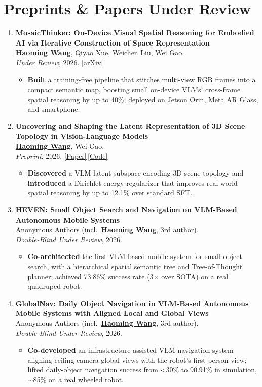 \documentclass[11pt, letterpaper]{article}
\newenvironment{publist}{
  \begin{enumerate}[leftmargin=1.7em, itemsep=4pt, parsep=0pt, topsep=2pt, label=\arabic*.]
}{\end{enumerate}}
\newcommand{\impactbullet}[1]{%
  \par\vspace{1pt}%
  \begin{itemize}[leftmargin=1.2em, topsep=0pt, itemsep=0pt, parsep=0pt, partopsep=0pt]
    \item #1
  \end{itemize}}
\newcommand{\me}{\underline{\textbf{Haoming Wang}}}
\newcommand{\meanon}{\underline{\textbf{Haoming Wang}}}
\begin{document}
\section{Preprints \& Papers Under Review}

\begin{publist}
\item \textbf{MosaicThinker: On-Device Visual Spatial Reasoning for Embodied AI via Iterative Construction of Space Representation}\\
\me, Qiyao Xue, Weichen Liu, Wei Gao.\\
\textit{Under Review}, 2026. \href{https://www.arxiv.org/abs/2602.07082}{[arXiv]}
\impactbullet{\textbf{Built} a training-free pipeline that stitches multi-view RGB frames into a compact semantic map, boosting small on-device VLMs' cross-frame spatial reasoning by up to 40\%; deployed on Jetson Orin, Meta AR Glass, and smartphone.}

\item \textbf{Uncovering and Shaping the Latent Representation of 3D Scene Topology in Vision-Language Models}\\
\me, Wei Gao.\\
\textit{Preprint}, 2026. \href{https://haomingwang645.github.io/pdfs/arxiv26_vlm_latent_shaping.pdf}{[Paper]}\,\href{https://github.com/pittisl/vlm-latent-shaping}{[Code]}
\impactbullet{\textbf{Discovered} a VLM latent subspace encoding 3D scene topology and \textbf{introduced} a Dirichlet-energy regularizer that improves real-world spatial reasoning by up to 12.1\% over standard SFT.}

\item \textbf{HEVEN: Small Object Search and Navigation on VLM-Based Autonomous Mobile Systems}\\
Anonymous Authors (incl.\ \meanon, 3rd author).\\
\textit{Double-Blind Under Review}, 2026.
\impactbullet{\textbf{Co-architected} the first VLM-based mobile system for small-object search, with a hierarchical spatial semantic tree and Tree-of-Thought planner; achieved 73.86\% success rate (3$\times$ over SOTA) on a real quadruped robot.}

\item \textbf{GlobalNav: Daily Object Navigation in VLM-Based Autonomous Mobile Systems with Aligned Local and Global Views}\\
Anonymous Authors (incl.\ \meanon, 3rd author).\\
\textit{Double-Blind Under Review}, 2026.
\impactbullet{\textbf{Co-developed} an infrastructure-assisted VLM navigation system aligning ceiling-camera global views with the robot's first-person view; lifted daily-object navigation success from <30\% to 90.91\% in simulation, $\sim$85\% on a real wheeled robot.}


\end{publist}
\end{document}
